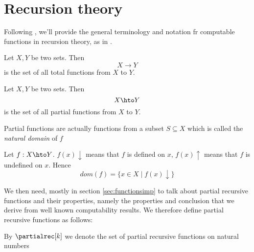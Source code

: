 \section{Recursion theory}
\label{sec:recursionth}
Following \cite{ranzato:analysis}, we'll provide the general
terminology and notation fr computable functions in recursion theory,
as in
\cite{cutland1980computability,odifreddi1992classical,rogers1987theory}.

\begin{definition}
  Let \(X,Y\) be two sets. Then \[X \to Y\] is the set of all total
  functions from \(X\) to \(Y\).
\end{definition}

\begin{definition}
  Let \(X,Y\) be two sets. Then \[X \hto Y\] is the set of all partial
  functions from \(X\) to \(Y\).
\end{definition}
\noindent

Partial functions are actually functions from a subset
\(S \subseteq X\) which is called the \emph{natural domain} of \(f\)

\begin{definition}
  Let \(f : X \hto Y\). \(f(x)\downarrow\) means that \(f\) is defined
  on \(x\), \(f(x)\uparrow\) means that \(f\) is undefined on
  \(x\). Hence \[dom(f) = \{x \in X \mid f(x)\downarrow\}\]
\end{definition}



We then need, mostly in section \ref{sec:functionsimp} to talk about
partial recursive functions and their properties, namely the
properties and conclusion that we derive from well known computability
results. We therefore define partial recursive functions as follows:

\begin{notation}\label{bg:partialrec}
  By \(\partialrec[k]\) we denote the set of partial recursive
  functions on natural numbers
\end{notation}


